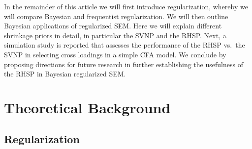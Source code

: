 \documentclass[
  man, donotrepeattitle,floatsintext]{apa6}
\begin{document}
In the remainder of this article we will first introduce regularization,
whereby we will compare Bayesian and frequentist regularization. We will
then outline Bayesian applications of regularized SEM. Here we will
explain different shrinkage priors in detail, in particular the SVNP and
the RHSP. Next, a simulation study is reported that assesses the
performance of the RHSP vs.~the SVNP in selecting cross loadings in a
simple CFA model. We conclude by proposing directions for future
research in further establishing the usefulness of the RHSP in Bayesian
regularized SEM.

\hypertarget{theoretical-background}{%
\section{Theoretical Background}\label{theoretical-background}}

\hypertarget{regularization}{%
\subsection{Regularization}\label{regularization}}
\end{document}
